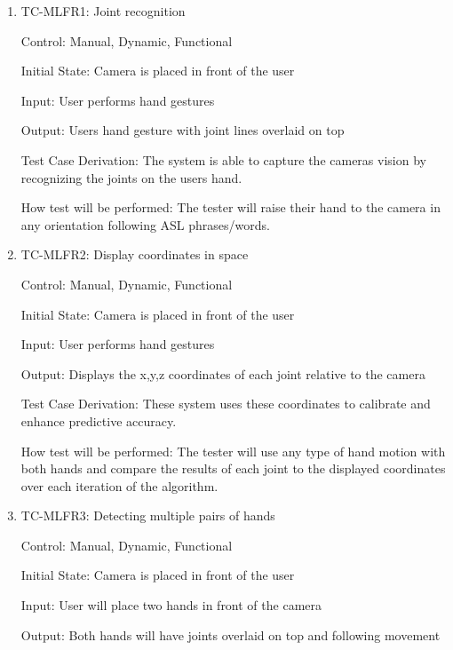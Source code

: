\documentclass[12pt]{article}
\begin{document}
\begin{enumerate}
  
\item{TC-MLFR1: Joint recognition\\}
  
Control: Manual, Dynamic, Functional
              
Initial State: Camera is placed in front of the user
              
Input: User performs hand gestures
              
Output: User\textquotesingle s hand gesture with joint lines overlaid on top
    
Test Case Derivation: The system is able to capture the camera\textquotesingle s vision by recognizing the joints on the user\textquotesingle s hand.
    
How test will be performed: The tester will raise their hand to the camera in any orientation following ASL phrases/words.
  
\item{TC-MLFR2: Display coordinates in space\\}
  
Control: Manual, Dynamic, Functional
              
Initial State: Camera is placed in front of the user
              
Input: User performs hand gestures
              
Output: Displays the x,y,z coordinates of each joint relative to the camera
    
Test Case Derivation: These system uses these coordinates to calibrate and enhance predictive accuracy.
    
How test will be performed: The tester will use any type of hand motion with both hands and compare the results of each joint to the displayed coordinates over each iteration of the algorithm.
  
\item{TC-MLFR3: Detecting multiple pairs of hands\\}
  
Control: Manual, Dynamic, Functional
              
Initial State: Camera is placed in front of the user
              
Input: User will place two hands in front of the camera
              
Output: Both hands will have joints overlaid on top and following movement
    

\end{enumerate}
\end{document}
